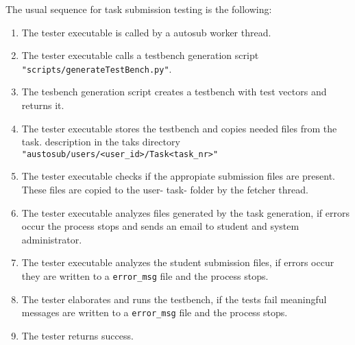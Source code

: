 The usual sequence for task submission testing is the following:
\begin{enumerate}
\item The tester executable is called by a autosub worker thread.
\item The tester executable calls a testbench generation script
    {\tt "scripts/generateTestBench.py"}.
\item The tesbench generation script creates a testbench with test vectors and returns it.
\item The tester executable stores the testbench and copies needed files from the task.
    description in the taks directory {\tt "austosub/users/<user\_id>/Task<task\_nr>"}
\item The tester executable checks if the appropiate submission files are present.
    These files are copied to the user- task- folder by the fetcher thread.
\item The tester executable analyzes files generated by the task generation, if errors
    occur the process stops and sends an email to student and system administrator.
\item The tester executable analyzes the student submission files, if errors occur they
    are written to a {\tt error\_msg} file and the process stops.
\item The tester elaborates and runs the testbench, if the tests fail meaningful messages
    are written to a {\tt error\_msg} file and the process stops.
\item The tester returns success.
\end{enumerate}
